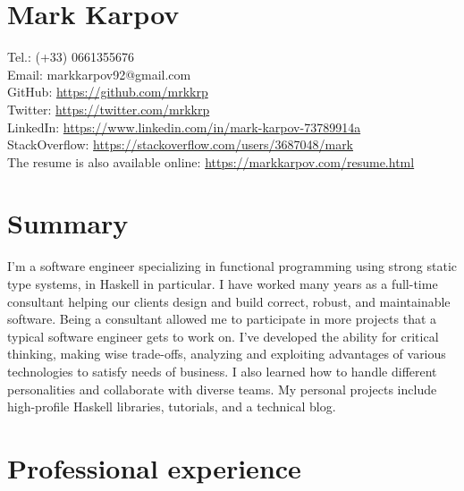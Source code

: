 \documentclass[a4paper,12pt]{article}
\begin{document}
\section*{Mark Karpov}

Tel.: (+33) 0661355676\\
Email: markkarpov92@gmail.com\\
GitHub: \href{https://github.com/mrkkrp}{https://github.com/mrkkrp}\\
Twitter: \href{https://twitter.com/mrkkrp}{https://twitter.com/mrkkrp}\\
LinkedIn: \href{https://www.linkedin.com/in/mark-karpov-73789914a}{https://www.linkedin.com/in/mark-karpov-73789914a}\\
StackOverflow: \href{https://stackoverflow.com/users/3687048/mark}{https://stackoverflow.com/users/3687048/mark}\\
The resume is also available online: \href{https://markkarpov.com/resume.html}{https://markkarpov.com/resume.html}

\sectionfont{\fontsize{12}{15}\selectfont\sectionrule{0pt}{0pt}{-5pt}{0.8pt}}

\section*{Summary}

I'm a software engineer specializing in functional programming using strong
static type systems, in Haskell in particular. I have worked many years as a
full-time consultant helping our clients design and build correct, robust,
and maintainable software. Being a consultant allowed me to participate in
more projects that a typical software engineer gets to work on. I've
developed the ability for critical thinking, making wise trade-offs,
analyzing and exploiting advantages of various technologies to satisfy needs
of business. I also learned how to handle different personalities and
collaborate with diverse teams. My personal projects include high-profile
Haskell libraries, tutorials, and a technical blog.

\section*{Professional experience}
\end{document}
